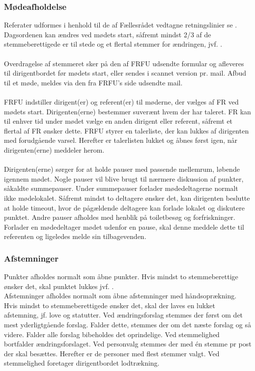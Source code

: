 \subsubsection{Mødeafholdelse}
Referater udformes i henhold til de af Fællesrådet vedtagne retningslinier se . Dagsordenen kan ændres ved mødets start, såfremt mindst 2/3 af de stemmeberettigede er til stede og et flertal stemmer for ændringen, jvf. .\\
\\
Overdragelse af stemmeret sker på den af FRFU udsendte formular og afleveres til dirigentbordet før mødets start, eller sendes i scannet version pr. mail. Afbud til et møde, meldes via den fra FRFU’s side udsendte mail.\\
\\
FRFU indstiller dirigent(er) og referent(er) til møderne, der vælges af FR ved mødets start. Dirigenten(erne) bestemmer suverænt hvem der har taleret. FR kan til enhver tid under mødet vælge en anden dirigent eller referent, såfremt et flertal af FR ønsker dette. FRFU styrer en talerliste, der kan lukkes af dirigenten med forudgående varsel. Herefter er talerlisten lukket og åbnes først igen, når dirigenten(erne) meddeler herom.\\
\\
Dirigenten(erne) sørger for at holde pauser med passende mellemrum, løbende igennem mødet. Nogle pauser vil blive brugt til nærmere diskussion af punkter, såkaldte summepauser. Under summepauser forlader mødedeltagerne normalt ikke mødelokalet. Såfremt mindst to deltagere ønsker det, kan dirigenten beslutte at holde timeout, hvor de pågældende deltagere kan forlade lokalet og diskutere punktet. Andre pauser afholdes med henblik på toiletbesøg og forfriskninger. Forlader en mødedeltager mødet udenfor en pause, skal denne meddele dette til referenten og ligeledes melde sin tilbagevenden.

\subsubsection{Afstemninger}
Punkter afholdes normalt som åbne punkter. Hvis mindst to stemmeberettige ønsker det, skal punktet lukkes jvf. .\\

Afstemninger afholdes normalt som åbne afstemninger med håndsoprækning. Hvis mindst to stemmeberettigede ønsker det, skal der laves en lukket afstemning, jf. love og statutter. Ved ændringsforslag stemmes der først om det mest yderligtgående forslag. Falder dette, stemmes der om det næste forslag og så videre. Falder alle forslag bibeholdes det oprindelige. Ved stemmelighed bortfalder ændringsforslaget. Ved personvalg stemmes der med én stemme pr post der skal besættes. Herefter er de personer med flest stemmer valgt. Ved stemmelighed foretager dirigentbordet lodtrækning.